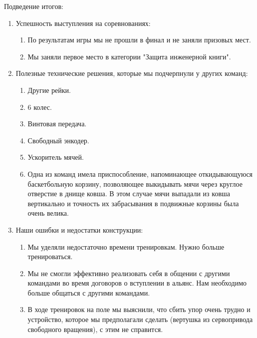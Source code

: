Подведение итогов:
\begin{enumerate}
  \item Успешность выступления на соревнованиях:
  \begin{enumerate}
	\item По результатам игры мы не прошли в финал и не заняли призовых мест.
	
	\item Мы заняли первое место в категории "Защита инженерной книги".
	
  \end{enumerate}
  
  \item Полезные технические решения, которые мы подчерпнули у других команд:
  \begin{enumerate}
  	
	\item Другие рейки.
	
	\item 6 колес.
	
	\item Винтовая передача.
	
	\item Свободный энкодер.
	
	\item Ускоритель мячей.
	
	\item Одна из команд имела приспособление, напоминающее откидывающуюся баскетбольную корзину, позволяющее выкидывать мячи через круглое отверстие в днище ковша. В этом случае мячи выпадали из ковша вертикально и точность их забрасывания в подвижные корзины была очень велика.
	
  \end{enumerate}
  
  \item Наши ошибки и недостатки конструкции:
  \begin{enumerate}
  	\item Мы уделяли недостаточно времени тренировкам. Нужно больше тренироваться.
  	
  	\item Мы не смогли эффективно реализовать себя в общении с другими командами во время договоров о вступлении в альянс. Нам необходимо больше общаться с другими командами.
  	
  	\item В ходе тренировок на поле мы выяснили, что сбить упор очень трудно и устройство, которое мы предполагали сделать (вертушка из сервопривода свободного вращения), с этим не справится.
  	

\end{enumerate}
\end{enumerate}
